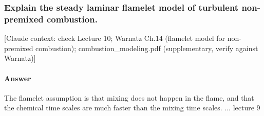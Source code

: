\subsubsection{Explain the steady laminar flamelet model of turbulent non-premixed combustion.}

\label{Q:stedylaminatflameletmodel}

{\color{gray}\footnotesize [Claude context: check Lecture 10; Warnatz Ch.14 (flamelet model for non-premixed combustion); combustion\_modeling.pdf (supplementary, verify against Warnatz)]}

\paragraph{Answer}
The flamelet assumption is that mixing does not happen in the flame, and that the chemical time scales are much faster than the mixing time scales.
... lecture 9

